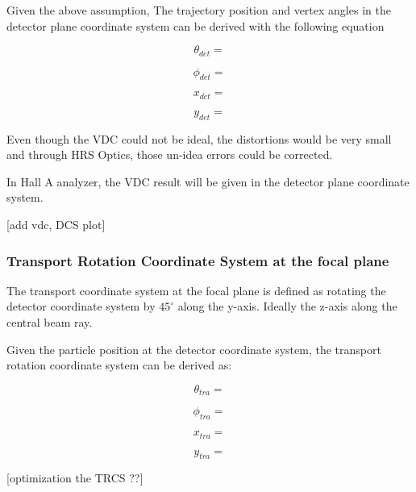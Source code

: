 Given the above assumption, The trajectory position and vertex angles in the detector plane coordinate system can be derived with the following equation 

\begin{equation}
    \theta_{det} = 
\end{equation}
    
\begin{equation}
    \phi_{det} = 
\end{equation}

\begin{equation}
    x_{det} =
\end{equation}

\begin{equation}
    y_{det} =
\end{equation}

Even though the VDC could not be ideal, the distortions would be very small and through HRS Optics, those un-idea errors could be corrected. 

In Hall A analyzer, the VDC result will be given in the detector plane coordinate system.

[add vdc, DCS plot]

\subsubsection{Transport Rotation Coordinate System at the focal plane}
The transport coordinate system at the focal plane is defined as rotating the detector coordinate system by $45^{\circ}$ along the y-axis. Ideally the z-axis along the central beam ray. 

Given the particle position at the detector coordinate system, the transport rotation coordinate system can be derived as:

\begin{equation}
    \theta_{tra}  = 
\end{equation}

\begin{equation}
    \phi_{tra} =
\end{equation}

\begin{equation}
    x_{tra} =
\end{equation}

\begin{equation}
    y_{tra} = 
\end{equation}


[optimization the TRCS ??]


